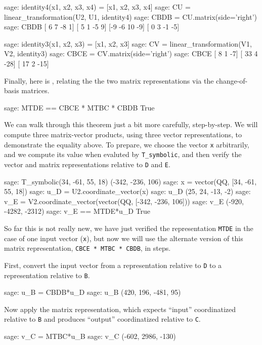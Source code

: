 %
\begin{sageexample}
sage: identity4(x1, x2, x3, x4) = [x1, x2, x3, x4]
sage: CU = linear_transformation(U2, U1, identity4)
sage: CBDB = CU.matrix(side='right')
sage: CBDB
[ 6  7 -8  1]
[ 5  1 -5  9]
[-9 -6 10 -9]
[ 0  3 -1 -5]
\end{sageexample}
%
\begin{sageexample}
sage: identity3(x1, x2, x3) = [x1, x2, x3]
sage: CV = linear_transformation(V1, V2, identity3)
sage: CBCE = CV.matrix(side='right')
sage: CBCE
[  8   1  -7]
[ 33   4 -28]
[ 17   2 -15]
\end{sageexample}
%
Finally, here is , relating the the two matrix representations via the change-of-basis matrices.
%
\begin{sageexample}
sage: MTDE == CBCE * MTBC * CBDB
True
\end{sageexample}
%
We can walk through this theorem just a bit more carefully, step-by-step.  We will compute three matrix-vector products, using three vector representations, to demonstrate the equality above.  To prepare, we choose the vector \verb?x? arbitrarily, and we compute its value when evaluted by \verb?T_symbolic?, and then verify the vector and matrix representations relative to \verb?D? and \verb?E?.
%
\begin{sageexample}
sage: T_symbolic(34, -61, 55, 18)
(-342, -236, 106)
sage: x = vector(QQ, [34, -61, 55, 18])
sage: u_D = U2.coordinate_vector(x)
sage: u_D
(25, 24, -13, -2)
sage: v_E = V2.coordinate_vector(vector(QQ, [-342, -236, 106]))
sage: v_E
(-920, -4282, -2312)
sage: v_E == MTDE*u_D
True
\end{sageexample}
%
So far this is not really new, we have just verified the representation \verb?MTDE? in the case of one input vector (\verb?x?), but now we will use the alternate version of this matrix representation, \verb?CBCE * MTBC * CBDB?, in steps.\par
%
First, convert the input vector from a representation relative to \verb?D? to a representation relative to \verb?B?.
%
\begin{sageexample}
sage: u_B = CBDB*u_D
sage: u_B
(420, 196, -481, 95)
\end{sageexample}
%
Now apply the matrix representation, which expects ``input'' coordinatized relative to \verb?B? and produces ``output'' coordinatized relative to \verb?C?.
%
\begin{sageexample}
sage: v_C = MTBC*u_B
sage: v_C
(-602, 2986, -130)
\end{sageexample}
